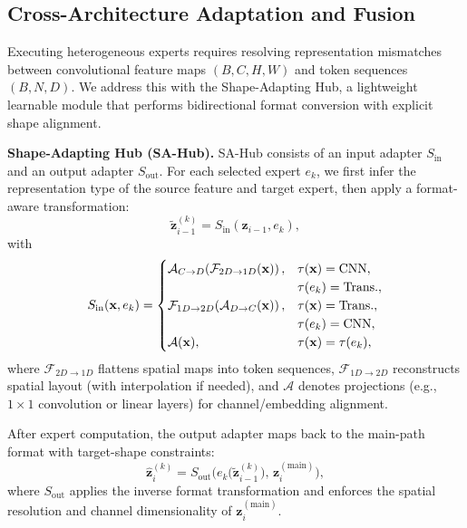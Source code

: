 \subsection{Cross-Architecture Adaptation and Fusion}
\label{subsec:sahub}
Executing heterogeneous experts requires resolving representation mismatches between convolutional feature maps $(B,C,H,W)$ and token sequences $(B,N,D)$. We address this with the Shape-Adapting Hub, a lightweight learnable module that performs bidirectional format conversion with explicit shape alignment.


\noindent\textbf{Shape-Adapting Hub (SA-Hub).}
SA-Hub consists of an input adapter $S_{\text{in}}$ and an output adapter $S_{\text{out}}$. For each selected expert $e_k$, we first infer the representation type of the source feature and target expert, then apply a format-aware transformation:
\begin{equation}
    \tilde{\mathbf{z}}_{i-1}^{(k)} = S_{\text{in}}(\mathbf{z}_{i-1}, e_k),
    \label{eq:sahub_in}
\end{equation}
with
\begin{equation*}
S_{\text{in}}(\mathbf{x}, e_k)=
\begin{cases}
\mathcal{A}_{C\rightarrow D}\!\left(\mathcal{F}_{2D\rightarrow 1D}(\mathbf{x})\right),
& \begin{array}[t]{@{}l@{}}
\tau(\mathbf{x})=\text{CNN},\\
\tau(e_k)=\text{Trans.},
\end{array}\\[3pt]
\mathcal{F}_{1D\rightarrow 2D}\!\left(\mathcal{A}_{D\rightarrow C}(\mathbf{x})\right),
& \begin{array}[t]{@{}l@{}}
\tau(\mathbf{x})=\text{Trans.},\\
\tau(e_k)=\text{CNN},
\end{array}\\[3pt]
\mathcal{A}(\mathbf{x}), & \tau(\mathbf{x})=\tau(e_k),
\end{cases}
\end{equation*}
where $\mathcal{F}_{2D\rightarrow 1D}$ flattens spatial maps into token sequences, $\mathcal{F}_{1D\rightarrow 2D}$ reconstructs spatial layout (with interpolation if needed), and $\mathcal{A}$ denotes projections (e.g., $1\times1$ convolution or linear layers) for channel/embedding alignment.

After expert computation, the output adapter maps back to the main-path format with target-shape constraints:
\begin{equation}
    \hat{\mathbf{z}}_i^{(k)} = S_{\text{out}}\bigg(e_k\big(\tilde{\mathbf{z}}_{i-1}^{(k)}\big),\, \mathbf{z}_i^{(\text{main})}\bigg),
    \label{eq:sahub_out}
\end{equation}
where $S_{\text{out}}$ applies the inverse format transformation and enforces the spatial resolution and channel dimensionality of $\mathbf{z}_i^{(\text{main})}$.


